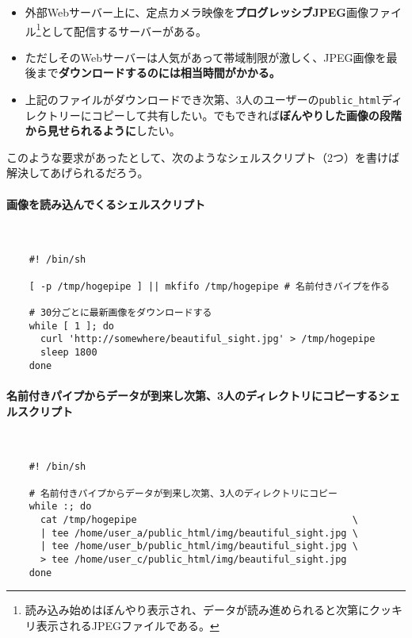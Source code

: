 \begin{itemize}
  \item 外部Webサーバー上に、定点カメラ映像を\textbf{プログレッシブJPEG}画像ファイル\footnote{読み込み始めはぼんやり表示され、データが読み進められると次第にクッキリ表示されるJPEGファイルである。}として配信するサーバーがある。
  \item ただしそのWebサーバーは人気があって帯域制限が激しく、JPEG画像を最後まで\textbf{ダウンロードするのには相当時間がかかる。}
  \item 上記のファイルがダウンロードでき次第、3人のユーザーの\verb|public_html|ディレクトリーにコピーして共有したい。でもできれば\textbf{ぼんやりした画像の段階から見せられるように}したい。
\end{itemize}

このような要求があったとして、次のようなシェルスクリプト（2つ）を書けば解決してあげられるだろう。

\paragraph{画像を読み込んでくるシェルスクリプト} 　\\
\begin{frameboxit}{160.0mm}
\begin{verbatim}
	#! /bin/sh

	[ -p /tmp/hogepipe ] || mkfifo /tmp/hogepipe # 名前付きパイプを作る

	# 30分ごとに最新画像をダウンロードする
	while [ 1 ]; do
	  curl 'http://somewhere/beautiful_sight.jpg' > /tmp/hogepipe
	  sleep 1800
	done
\end{verbatim}
\end{frameboxit}
\paragraph{名前付きパイプからデータが到来し次第、3人のディレクトリにコピーするシェルスクリプト} 　\\
\begin{frameboxit}{160.0mm}
\begin{verbatim}
	#! /bin/sh

	# 名前付きパイプからデータが到来し次第、3人のディレクトリにコピー
	while :; do
	  cat /tmp/hogepipe                                      \
	  | tee /home/user_a/public_html/img/beautiful_sight.jpg \
	  | tee /home/user_b/public_html/img/beautiful_sight.jpg \
	  > tee /home/user_c/public_html/img/beautiful_sight.jpg
	done
\end{verbatim}
\end{frameboxit}

